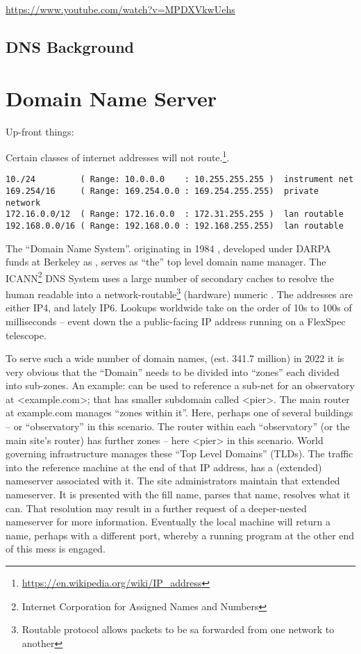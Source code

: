 \url{https://www.youtube.com/watch?v=MPDXVkwUehs}


\subsection{DNS Background}\section{Domain Name Server}

Up-front things:

Certain classes of internet addresses will not route.\footnote{\url{https://en.wikipedia.org/wiki/IP_address}}.

\begingroup \fontsize{8pt}{8pt}
\selectfont
\begin{verbatim} 
10./24         ( Range: 10.0.0.0    : 10.255.255.255 )  instrument net
169.254/16     ( Range: 169.254.0.0 : 169.254.255.255)  private network
172.16.0.0/12  ( Range: 172.16.0.0  : 172.31.255.255 )  lan routable
192.168.0.0/16 ( Range: 192.168.0.0 : 192.168.255.255)  lan routable
\end{verbatim}
\endgroup

The ``Domain Name System''. originating in 1984 \cite{BIND_Manual1},
developed under DARPA funds at Berkeley as , serves as ``the'' top level domain name manager. The
ICANN\footnote{Internet Corporation for Assigned Names and Numbers}
DNS System uses a large number of secondary caches to resolve the
human readable  into a
network-routable\footnote{Routable protocol allows packets to be
sa  forwarded from one network to another} (hardware) numeric
.  The addresses are either IP4, and
lately IP6. Lookups worldwide take on the order of 10s to 100s of
milliseconds -- event down the a public-facing IP address running on a
FlexSpec telescope.

To serve such a wide number of domain names, (est. 341.7 million) in 2022
it is very obvious that the ``Domain'' needs to be divided into ``zones'' each
divided into sub-zones. An example:   can
be used to reference a sub-net for an observatory at <example.com>; that has 
smaller subdomain called <pier>. The main router at example.com manages ``zones
within it''. Here, perhaps one of several buildings -- or ``observatory''
in this scenario. The router within each ``observatory'' (or the main
site's router) has further zones -- here <pier> in this scenario. World
governing infrastructure manages these ``Top Level Domains'' (TLDs). 
The traffic into the reference machine at the end of that IP address,
has a (extended) nameserver associated with it. The site administrators maintain
that extended nameserver. It is presented with the fill name, parses that
name, resolves what it can. That resolution may result in a further 
request of a deeper-nested nameserver for more information. Eventually
the local machine will return a name, perhaps with a different port,
whereby a running program at the other end of this mess is engaged.

